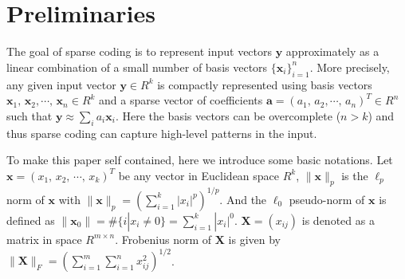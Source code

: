 \section{Preliminaries}
The goal of sparse coding is to represent input vectors $\mathbf{y}$ approximately as a linear combination of a small number of basis vectors $\{\mathbf{x}_i\}_{i=1}^n$.
More precisely, any given input vector $\mathbf{y}\in R^k$ is compactly represented using basis vectors $\mathbf{x}_1,\,\mathbf{x}_2,\cdots,\,\mathbf{x}_n\in R^k$ and a sparse vector of coefficients $\mathbf{a}=(a_1,\,a_2,\cdots ,\,a_n)^T\in R^n$ such that $\mathbf{y} \approx \sum_i a_i\mathbf{x}_i$.
Here the basis vectors can be overcomplete ($n>k$) and thus sparse coding can capture high-level patterns in the input.

To make this paper self contained, here we introduce some basic notations.
Let $\mathbf{x}=(x_1,\,x_2,\,\cdots ,\,x_k)^T$ be any vector in Euclidean space $R^k$, $\|\mathbf{x}\|_p$  is the $\ell_p$ norm of $\mathbf{x}$ with $\|\mathbf{x}\|_p=(\sum_{i=1}^k |x_i|^p)^{1/p}$. And the $\ell_0$ pseudo-norm of $\mathbf{x}$ is defined as $\|\mathbf{x}_0\|=\#\{i|x_i\neq 0\}=\sum_{i=1}^k |x_i|^0$.
$\mathbf{X}=(x_{ij})$ is denoted as a matrix in space $R^{m\times n}$.
Frobenius norm of $\mathbf{X}$ is given by $\|\mathbf{X}\|_F=(\sum_{i=1}^m\sum_{i=1}^n x_{ij}^2)^{1/2}$.
